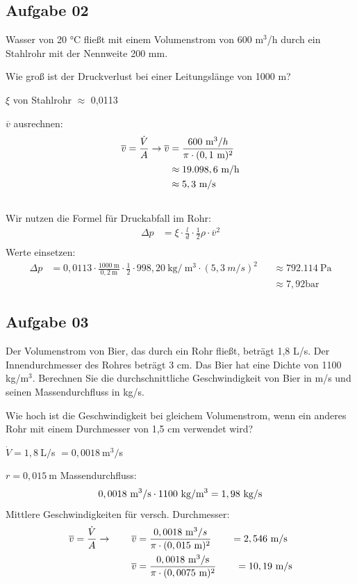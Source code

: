 \documentclass[a4paper,10pt]{article}
\begin{document}
\pagebreak

\subsection*{Aufgabe 02}
Wasser von 20 °C fließt mit einem Volumenstrom von 600 m$^3$/h durch ein Stahlrohr mit der Nennweite 200 mm. \par 
Wie groß ist der Druckverlust bei einer Leitungslänge von 1000 m?

$\xi$ von Stahlrohr $\approx$ 0,0113 \par 
$\overline{v}$ ausrechnen:
\begin{align*}
\overline{v} = \frac{\dot{V}}{A} \rightarrow \overline{v} &= \frac{600~ \text{m}^3/h}{\pi \cdot (0,1~\text{m})^2} \\
 &\approx 19.098,6~\text{m/h} \\
 &\approx 5,3~\text{m/s}  \\ \\
\end{align*}
Wir nutzen die Formel für Druckabfall im Rohr:
\begin{align*}
\Delta p &= \xi \cdot \frac{l}{d} \cdot \frac{1}{2} \rho \cdot \overline{v}^2\\
\end{align*}
Werte einsetzen:
\begin{align*}
\Delta p &= 0,0113 \cdot \frac{1000~\text{m}}{0,2~\text{m}} \cdot \frac{1}{2} \cdot 998,20 ~\text{kg}/~\text{m}^3 \cdot (5,3~m/s)^2 &&\approx 792.114~\text{Pa}\\
& &&\approx 7,92 \text{bar}
\end{align*}


\pagebreak

\subsection*{Aufgabe 03}
Der Volumenstrom von Bier, das durch ein Rohr fließt, beträgt 1,8 L/s. Der
Innendurchmesser des Rohres beträgt 3 cm. Das Bier hat eine Dichte von 1100 kg/m$^3$.
Berechnen Sie die durchschnittliche Geschwindigkeit von Bier in m/s und seinen Massendurchfluss in kg/s. \par Wie hoch ist die Geschwindigkeit bei gleichem Volumenstrom, wenn ein anderes Rohr mit einem Durchmesser von 1,5 cm verwendet wird?

$\dot{V} = 1,8 ~$L$/$s $ = 0,0018~$m$^3/$s \par 
$r=0,015~$m \pp
Massendurchfluss:
\begin{align*}
0,0018~\text{m}^3/\text{s} \cdot 1100~\text{kg}/\text{m}^3 = 1,98~\text{kg}/\text{s}
\end{align*}
Mittlere Geschwindigkeiten für versch. Durchmesser:
\begin{align*}
\overline{v} = \frac{\dot{V}}{A} \rightarrow \qquad \overline{v} &= \frac{0,0018~\text{m}^3/s}{\pi \cdot (0,015~\text{m})^2} \qquad = 2,546~\text{m}/\text{s} \\
\overline{v} &= \frac{0,0018~\text{m}^3/\text{s}}{\pi \cdot (0,0075~\text{m})^2} \qquad = 10,19~\text{m}/\text{s} \\
\end{align*}
\end{document}
